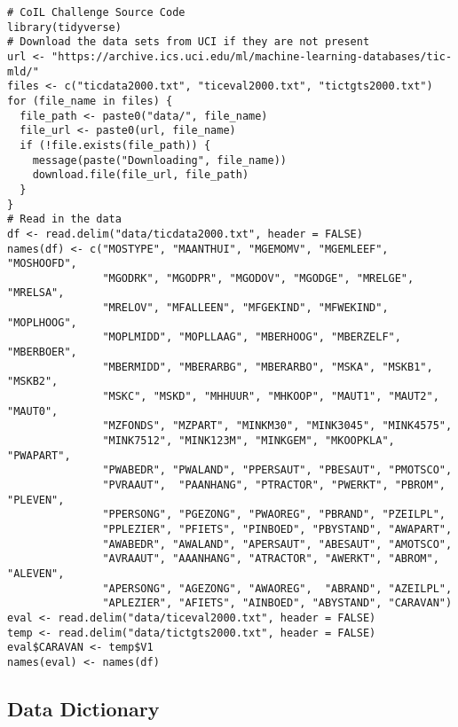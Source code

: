 \documentclass[man]{apa6}
\begin{document}
\begin{verbatim}
# CoIL Challenge Source Code 
library(tidyverse) 
# Download the data sets from UCI if they are not present 
url <- "https://archive.ics.uci.edu/ml/machine-learning-databases/tic-mld/" 
files <- c("ticdata2000.txt", "ticeval2000.txt", "tictgts2000.txt") 
for (file_name in files) { 
  file_path <- paste0("data/", file_name) 
  file_url <- paste0(url, file_name) 
  if (!file.exists(file_path)) { 
    message(paste("Downloading", file_name)) 
    download.file(file_url, file_path) 
  } 
} 
# Read in the data 
df <- read.delim("data/ticdata2000.txt", header = FALSE) 
names(df) <- c("MOSTYPE", "MAANTHUI", "MGEMOMV", "MGEMLEEF", "MOSHOOFD", 
               "MGODRK", "MGODPR", "MGODOV", "MGODGE", "MRELGE", "MRELSA", 
               "MRELOV", "MFALLEEN", "MFGEKIND", "MFWEKIND", "MOPLHOOG", 
               "MOPLMIDD", "MOPLLAAG", "MBERHOOG", "MBERZELF", "MBERBOER", 
               "MBERMIDD", "MBERARBG", "MBERARBO", "MSKA", "MSKB1", "MSKB2", 
               "MSKC", "MSKD", "MHHUUR", "MHKOOP", "MAUT1", "MAUT2", "MAUT0", 
               "MZFONDS", "MZPART", "MINKM30", "MINK3045", "MINK4575", 
               "MINK7512", "MINK123M", "MINKGEM", "MKOOPKLA", "PWAPART", 
               "PWABEDR", "PWALAND", "PPERSAUT", "PBESAUT", "PMOTSCO", 
               "PVRAAUT",  "PAANHANG", "PTRACTOR", "PWERKT", "PBROM", "PLEVEN", 
               "PPERSONG", "PGEZONG", "PWAOREG", "PBRAND", "PZEILPL", 
               "PPLEZIER", "PFIETS", "PINBOED", "PBYSTAND", "AWAPART", 
               "AWABEDR", "AWALAND", "APERSAUT", "ABESAUT", "AMOTSCO", 
               "AVRAAUT", "AAANHANG", "ATRACTOR", "AWERKT", "ABROM", "ALEVEN", 
               "APERSONG", "AGEZONG", "AWAOREG",  "ABRAND", "AZEILPL", 
               "APLEZIER", "AFIETS", "AINBOED", "ABYSTAND", "CARAVAN") 
eval <- read.delim("data/ticeval2000.txt", header = FALSE) 
temp <- read.delim("data/tictgts2000.txt", header = FALSE) 
eval$CARAVAN <- temp$V1 
names(eval) <- names(df) 
\end{verbatim}

\newpage

\hypertarget{data-dictionary}{%
\subsection{Data Dictionary}\label{data-dictionary}}
\end{document}
